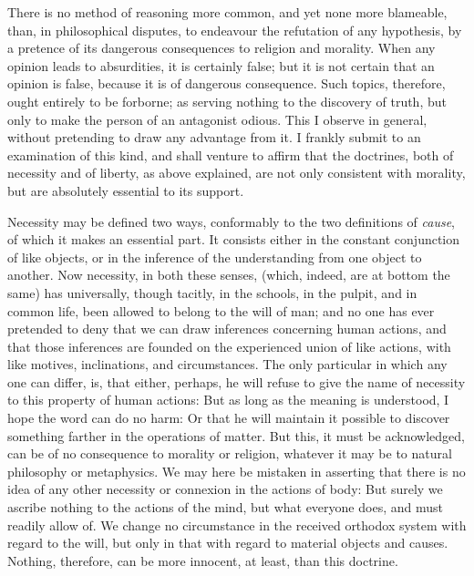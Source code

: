 \documentclass[]{article}
\begin{document}
\begin{sectionbody}

\humeparagraph  There is no method of reasoning more common, and yet none more blameable, than, in philosophical disputes, to endeavour the refutation of any hypothesis, by a pretence of its dangerous consequences to religion and morality. When any opinion leads to absurdities, it is certainly false; but it is not certain that an opinion is false, because it is of dangerous consequence. Such topics, therefore, ought entirely to be forborne; as serving nothing to the discovery of truth, but only to make the person of an antagonist odious. This I observe in general, without pretending to draw any advantage from it. I frankly submit to an examination of this kind, and shall venture to affirm that the doctrines, both of necessity and of liberty, as above explained, are not only consistent with morality, but are absolutely essential to its support.

\humeparagraph  Necessity may be defined two ways, conformably to the two definitions of \emph{cause}, of which it makes an essential part. It consists either in the constant conjunction of like objects, or in the inference of the understanding from one object to another. Now necessity, in both these senses, (which, indeed, are at bottom the same) has universally, though tacitly, in the schools, in the pulpit, and in common life, been allowed to belong to the will of man; and no one has ever pretended to deny that we can draw inferences concerning human actions, and that those inferences are founded on the experienced union of like actions, with like motives, inclinations, and circumstances. The only particular in which any one can differ, is, that either, perhaps, he will refuse to give the name of necessity to this property of human actions: But as long as the meaning is understood, I hope the word can do no harm: Or that he will maintain it possible to discover something farther in the operations of matter. But this, it must be acknowledged, can be of no consequence to morality or religion, whatever it may be to natural philosophy or metaphysics. We may here be mistaken in asserting that there is no idea of any other necessity or connexion in the actions of body: But surely we ascribe nothing to the actions of the mind, but what everyone does, and must readily allow of. We change no circumstance in the received orthodox system with regard to the will, but only in that with regard to material objects and causes. Nothing, therefore, can be more innocent, at least, than this doctrine.


\end{sectionbody}
\end{document}

